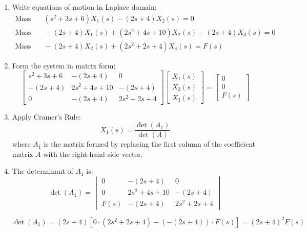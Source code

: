 \documentclass[11pt]{article}
\begin{document}
\begin{enumerate}[label=(\alph*), itemindent=*, leftmargin=*, nolistsep]

    \item Write equations of motion in Laplace domain:
    \begin{align*}
        \text{Mass 1:} & \quad (s^2 + 3s + 6)X_1(s) - (2s + 4)X_2(s) = 0 \\
        \text{Mass 2:} & \quad -(2s + 4)X_1(s) + (2s^2 + 4s + 10)X_2(s) - (2s + 4)X_3(s) = 0 \\
        \text{Mass 3:} & \quad -(2s + 4)X_2(s) + (2s^2 + 2s + 4)X_3(s) = F(s)
    \end{align*}

    \item Form the system in matrix form:
    \[
    \begin{bmatrix}
    s^2 + 3s + 6 & -(2s + 4) & 0 \\
    -(2s + 4) & 2s^2 + 4s + 10 & -(2s + 4) \\
    0 & -(2s + 4) & 2s^2 + 2s + 4
    \end{bmatrix}
    \begin{bmatrix}
    X_1(s) \\
    X_2(s) \\
    X_3(s)
    \end{bmatrix}
    =
    \begin{bmatrix}
    0 \\
    0 \\
    F(s)
    \end{bmatrix}
    \]

    \item Apply Cramer's Rule:
    \[
    X_1(s) = \frac{\det(A_1)}{\det(A)}
    \]
    where \( A_1 \) is the matrix formed by replacing the first column of the coefficient matrix \( A \) with the right-hand side vector.
    \vspace{0.3em}

    \item The determinant of \( A_1 \) is:
    \[
    \det(A_1) = \begin{vmatrix}
    0 & -(2s + 4) & 0 \\
    0 & 2s^2 + 4s + 10 & -(2s + 4) \\
    F(s) & -(2s + 4) & 2s^2 + 2s + 4
    \end{vmatrix}
    \]

    \[
    \det(A_1) = (2s + 4) \left[ 0 \cdot (2s^2 + 2s + 4) - (- (2s + 4)) \cdot F(s) \right]
    = (2s + 4)^2 F(s)
    \]
    

\end{enumerate}
\end{document}
